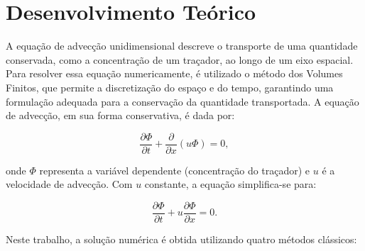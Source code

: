 \section{Desenvolvimento Teórico}

A equação de advecção unidimensional descreve o transporte de uma quantidade conservada, como a concentração de um traçador, ao longo de um eixo espacial. Para resolver essa equação numericamente, é utilizado o método dos Volumes Finitos, que permite a discretização do espaço e do tempo, garantindo uma formulação adequada para a conservação da quantidade transportada. A equação de advecção, em sua forma conservativa, é dada por:

\begin{equation}
    \frac{\partial \Phi}{\partial t} + \frac{\partial}{\partial x} (u \Phi) = 0,
\end{equation}

onde $\Phi$ representa a variável dependente (concentração do traçador) e $u$ é a velocidade de advecção. Com $u$ constante, a equação simplifica-se para:

\begin{equation}
    \frac{\partial \Phi}{\partial t} + u \frac{\partial \Phi}{\partial x} = 0.
\end{equation}

Neste trabalho, a solução numérica é obtida utilizando quatro métodos clássicos:

